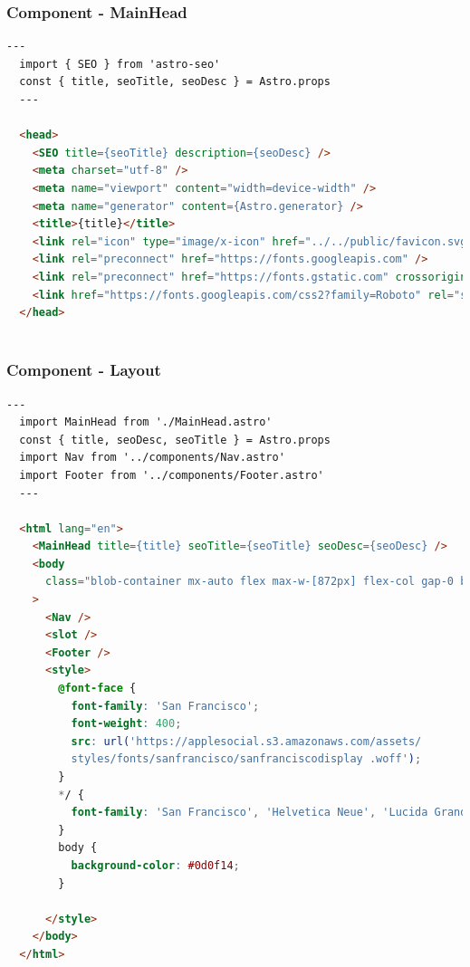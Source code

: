 \documentclass[12pt, a4paper, oneside]{thesis}
\begin{document}
\subsubsection{Component - MainHead}

\begin{lstlisting}[language=HTML, caption={Component - MainHead}, label=Component - MainHead]
  ---
  import { SEO } from 'astro-seo'
  const { title, seoTitle, seoDesc } = Astro.props
  ---
  
  <head>
    <SEO title={seoTitle} description={seoDesc} />
    <meta charset="utf-8" />
    <meta name="viewport" content="width=device-width" />
    <meta name="generator" content={Astro.generator} />
    <title>{title}</title>
    <link rel="icon" type="image/x-icon" href="../../public/favicon.svg" sizes="any" />
    <link rel="preconnect" href="https://fonts.googleapis.com" />
    <link rel="preconnect" href="https://fonts.gstatic.com" crossorigin />
    <link href="https://fonts.googleapis.com/css2?family=Roboto" rel="stylesheet" />
  </head>
  
\end{lstlisting}

\newpage

\subsubsection{Component - Layout}

\begin{lstlisting}[language=HTML, caption={Component - Layout}, label=Component - Layout]
  ---
  import MainHead from './MainHead.astro'
  const { title, seoDesc, seoTitle } = Astro.props
  import Nav from '../components/Nav.astro'
  import Footer from '../components/Footer.astro'
  ---
  
  <html lang="en">
    <MainHead title={title} seoTitle={seoTitle} seoDesc={seoDesc} />
    <body
      class="blob-container mx-auto flex max-w-[872px] flex-col gap-0 bg-neutral-900 px-10 py-8 text-sm text-white"
    >
      <Nav />
      <slot />
      <Footer />
      <style>
        @font-face {
          font-family: 'San Francisco';
          font-weight: 400;
          src: url('https://applesocial.s3.amazonaws.com/assets/
          styles/fonts/sanfrancisco/sanfranciscodisplay .woff');
        }
        */ {
          font-family: 'San Francisco', 'Helvetica Neue', 'Lucida Grande', sans-serif;
        }
        body {
          background-color: #0d0f14;
        }
        
      </style>
    </body>
  </html>
  
\end{lstlisting}
\end{document}
